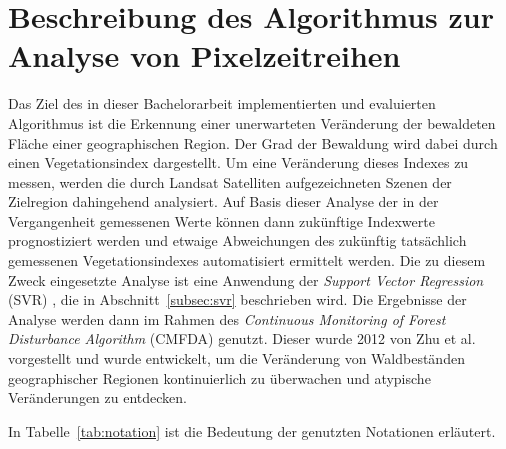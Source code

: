 \section[Beschreibung des Algorithmus]{Beschreibung des Algorithmus zur Analyse von Pixelzeitreihen}
\label{sec:DescriptionOfTheAlgorithm}
Das Ziel des in dieser Bachelorarbeit implementierten und evaluierten Algorithmus ist die Erkennung einer unerwarteten Veränderung der bewaldeten Fläche einer geographischen Region. Der Grad der Bewaldung wird dabei durch einen Vegetationsindex dargestellt. Um eine Veränderung dieses Indexes zu messen, werden die durch Landsat Satelliten aufgezeichneten Szenen der Zielregion dahingehend analysiert. Auf Basis dieser Analyse der in der Vergangenheit gemessenen Werte können dann zukünftige Indexwerte prognostiziert werden und etwaige Abweichungen des zukünftig tatsächlich gemessenen Vegetationsindexes automatisiert ermittelt werden. Die zu diesem Zweck eingesetzte Analyse ist eine Anwendung der \textit{Support Vector Regression} (SVR) \cite{Basak2007}, die in Abschnitt~\ref{subsec:svr} beschrieben wird. Die Ergebnisse der Analyse werden dann im Rahmen des \textit{Continuous Monitoring of Forest Disturbance Algorithm} (CMFDA) \cite{Zhu2012} genutzt. Dieser wurde 2012 von Zhu et al. vorgestellt \cite{Zhu2012} und wurde entwickelt, um die Veränderung von Waldbeständen geographischer Regionen kontinuierlich zu überwachen und atypische Veränderungen zu entdecken. 

In Tabelle~\ref{tab:notation} ist die Bedeutung der genutzten Notationen erläutert.

